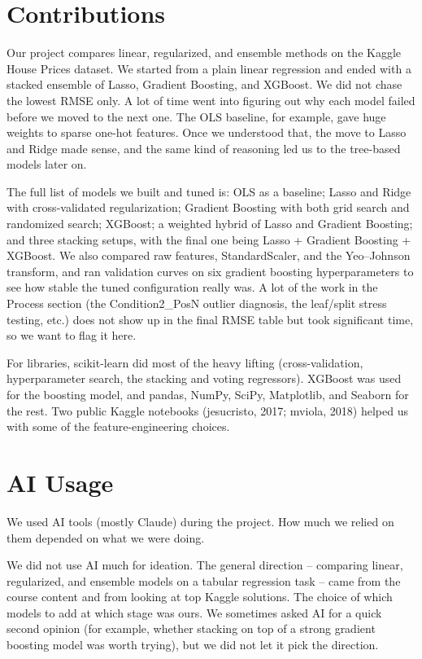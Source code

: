 \documentclass{article}
\begin{document}
\section{Contributions}

Our project compares linear, regularized, and ensemble methods on
the Kaggle House Prices dataset. We started from a plain linear
regression and ended with a stacked ensemble of Lasso, Gradient
Boosting, and XGBoost. We did not chase the lowest RMSE only.
A lot of time went into figuring out why each model failed before
we moved to the next one. The OLS baseline, for example, gave
huge weights to sparse one-hot features. Once we understood that,
the move to Lasso and Ridge made sense, and the same kind of
reasoning led us to the tree-based models later on.

The full list of models we built and tuned is: OLS as a baseline;
Lasso and Ridge with cross-validated regularization; Gradient
Boosting with both grid search and randomized search; XGBoost; a
weighted hybrid of Lasso and Gradient Boosting; and three stacking
setups, with the final one being Lasso + Gradient Boosting +
XGBoost. We also compared raw features, StandardScaler, and the
Yeo--Johnson transform, and ran validation curves on six gradient
boosting hyperparameters to see how stable the tuned configuration
really was. A lot of the work in the Process section
(the Condition2\_PosN outlier diagnosis, the leaf/split stress
testing, etc.) does not show up in the final RMSE table but took
significant time, so we want to flag it here.

For libraries, scikit-learn did most of the heavy lifting
(cross-validation, hyperparameter search, the stacking and voting
regressors). XGBoost was used for the boosting model, and pandas,
NumPy, SciPy, Matplotlib, and Seaborn for the rest. Two public
Kaggle notebooks (jesucristo, 2017; mviola, 2018) helped us with
some of the feature-engineering choices.

\section{AI Usage}

We used AI tools (mostly Claude) during the project. How much we
relied on them depended on what we were doing.

We did not use AI much for ideation. The general direction --
comparing linear, regularized, and ensemble models on a tabular
regression task -- came from the course content and from looking
at top Kaggle solutions. The choice of which models to add at
which stage was ours. We sometimes asked AI for a quick second
opinion (for example, whether stacking on top of a strong gradient
boosting model was worth trying), but we did not let it pick the
direction.
\end{document}
